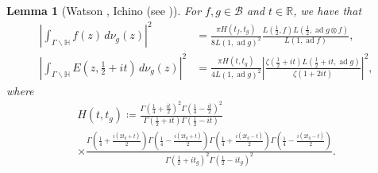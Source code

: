 \documentclass[11pt,a4paper]{amsart}
\newcommand{\BB}{\mathcal{B}}
\newcommand{\Hb}{\mathbb{H}}
\newcommand{\R}{\mathbb{R}}
\DeclareMathOperator{\ad}{ad}
\numberwithin{equation}{section}
\newtheorem{lemma}[equation]{Lemma}
\theoremstyle{remark}
\theoremstyle{definition}
\begin{document}
\begin{lemma}[{Watson \cite{Wat08}, Ichino \cite{Ich08} (see \cite[Proposition 2.8]{Hum18})}]
\label{lem:WatsonIchino}
For $f,g \in \BB$ and $t \in \R$, we have that
\begin{align*}
\left|\int_{\Gamma \backslash \Hb} f(z) \, d\nu_g(z)\right|^2 & = \frac{\pi H(t_f,t_g)}{8 L(1,\ad g)^2} \frac{L\left(\frac{1}{2},f\right) L\left(\frac{1}{2},\ad g \otimes f\right)}{L(1,\ad f)},	\\
\left|\int_{\Gamma \backslash \Hb} E\left(z,\frac{1}{2} + it\right) \, d\nu_g(z)\right|^2 & = \frac{\pi H(t,t_g)}{4 L(1,\ad g)^2} \left|\frac{\zeta\left(\frac{1}{2} + it\right) L\left(\frac{1}{2} + it,\ad g\right)}{\zeta(1 + 2it)}\right|^2,
\end{align*}
where
\begin{multline*}
H(t,t_g) \coloneqq \frac{\Gamma\left(\frac{1}{4} + \frac{it}{2}\right)^2 \Gamma\left(\frac{1}{4} - \frac{it}{2}\right)^2}{\Gamma\left(\frac{1}{2} + it\right) \Gamma\left(\frac{1}{2} - it\right)}	\\
\times \frac{\Gamma\left(\frac{1}{4} + \frac{i(2t_g + t)}{2}\right) \Gamma\left(\frac{1}{4} - \frac{i(2t_g + t)}{2}\right) \Gamma\left(\frac{1}{4} + \frac{i(2t_g - t)}{2}\right) \Gamma\left(\frac{1}{4} - \frac{i(2t_g - t)}{2}\right)}{\Gamma\left(\frac{1}{2} + it_g\right)^2 \Gamma\left(\frac{1}{2} - it_g\right)^2}.
\end{multline*}
\end{lemma}
\end{document}

